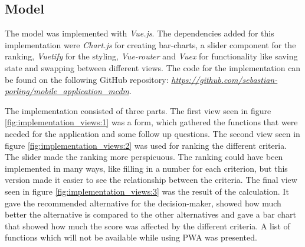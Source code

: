 \subsection{Model}

The model was implemented with \textit{Vue.js}. The dependencies added for this implementation were \textit{Chart.js} for creating bar-charts, a slider component for the ranking, \textit{Vuetify} for the styling, \textit{Vue-router} and \textit{Vuex} for functionality like saving state and swapping between different views. The code for the implementation can be found on the following GitHub repository: 
\textit{\href{https://github.com/sebastian-porling/mobile\_application\_mcdm}{https://github.com/sebastian-porling/mobile\_application\_mcdm}}. 

The implementation consisted of three parts. The first view seen in figure \ref{fig:implementation_views:1} was a form, which gathered the functions that were needed for the application and some follow up questions. The second view seen in figure \ref{fig:implementation_views:2} was used for ranking the different criteria. The slider made the ranking more perspicuous. The ranking could have been implemented in many ways, like filling in a number for each criterion, but this version made it easier to see the relationship between the criteria. The final view seen in figure \ref{fig:implementation_views:3} was the result of the calculation. It gave the recommended alternative for the decision-maker, showed how much better the alternative is compared to the other alternatives and gave a bar chart that showed how much the score was affected by the different criteria. A list of functions which will not be available while using PWA was presented. 

